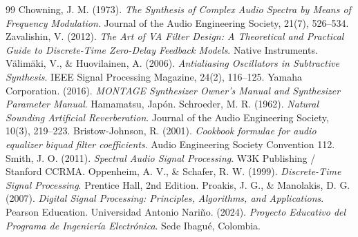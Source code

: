 \documentclass[11pt,a4paper]{article}
\begin{document}
\newpage
\begin{thebibliography}{99}
 Chowning, J. M. (1973). \textit{The Synthesis of Complex Audio Spectra by Means of Frequency Modulation}. Journal of the Audio Engineering Society, 21(7), 526–534.
 Zavalishin, V. (2012). \textit{The Art of VA Filter Design: A Theoretical and Practical Guide to Discrete-Time Zero-Delay Feedback Models}. Native Instruments.
 Välimäki, V., \& Huovilainen, A. (2006). \textit{Antialiasing Oscillators in Subtractive Synthesis}. IEEE Signal Processing Magazine, 24(2), 116–125.
 Yamaha Corporation. (2016). \textit{MONTAGE Synthesizer Owner's Manual and Synthesizer Parameter Manual}. Hamamatsu, Japón.
 Schroeder, M. R. (1962). \textit{Natural Sounding Artificial Reverberation}. Journal of the Audio Engineering Society, 10(3), 219–223.
 Bristow-Johnson, R. (2001). \textit{Cookbook formulae for audio equalizer biquad filter coefficients}. Audio Engineering Society Convention 112.
 Smith, J. O. (2011). \textit{Spectral Audio Signal Processing}. W3K Publishing / Stanford CCRMA.
 Oppenheim, A. V., \& Schafer, R. W. (1999). \textit{Discrete-Time Signal Processing}. Prentice Hall, 2nd Edition.
 Proakis, J. G., \& Manolakis, D. G. (2007). \textit{Digital Signal Processing: Principles, Algorithms, and Applications}. Pearson Education.
 Universidad Antonio Nariño. (2024). \textit{Proyecto Educativo del Programa de Ingeniería Electrónica}. Sede Ibagué, Colombia.
\end{thebibliography}
\end{document}
